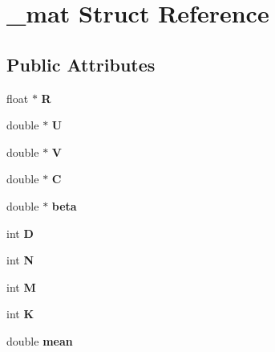 \hypertarget{struct__mat}{\section{\-\_\-mat \-Struct \-Reference}
\label{struct__mat}
}
\subsection*{\-Public \-Attributes}
\begin{DoxyCompactItemize}
\item 
\hypertarget{struct__mat_a6718a59d27cd8e2d3501e57800bf85d9}{float $\ast$ {\bfseries \-R}}\label{struct__mat_a6718a59d27cd8e2d3501e57800bf85d9}

\item 
\hypertarget{struct__mat_a0d29d0d3e2edc89c1da92ad47b2a0d91}{double $\ast$ {\bfseries \-U}}\label{struct__mat_a0d29d0d3e2edc89c1da92ad47b2a0d91}

\item 
\hypertarget{struct__mat_a83f1aa0816b8e0fc3921baaf9636857d}{double $\ast$ {\bfseries \-V}}\label{struct__mat_a83f1aa0816b8e0fc3921baaf9636857d}

\item 
\hypertarget{struct__mat_a480f63d30717e14a3342b088f9ca8836}{double $\ast$ {\bfseries \-C}}\label{struct__mat_a480f63d30717e14a3342b088f9ca8836}

\item 
\hypertarget{struct__mat_a1f4ca580f7d2834b2aa7cbceb733ad4c}{double $\ast$ {\bfseries beta}}\label{struct__mat_a1f4ca580f7d2834b2aa7cbceb733ad4c}

\item 
\hypertarget{struct__mat_aeed3177d58c430fce8550389124f8586}{int {\bfseries \-D}}\label{struct__mat_aeed3177d58c430fce8550389124f8586}

\item 
\hypertarget{struct__mat_af01a61786743a215d56537d3cead86a9}{int {\bfseries \-N}}\label{struct__mat_af01a61786743a215d56537d3cead86a9}

\item 
\hypertarget{struct__mat_abd80a8fe390ed22671e93d0b1cb15d91}{int {\bfseries \-M}}\label{struct__mat_abd80a8fe390ed22671e93d0b1cb15d91}

\item 
\hypertarget{struct__mat_ad6c51ea46d76c30cbaf20aa814708d67}{int {\bfseries \-K}}\label{struct__mat_ad6c51ea46d76c30cbaf20aa814708d67}

\item 
\hypertarget{struct__mat_a093e431ebae7a526fff81cb905226b8b}{double {\bfseries mean}}\label{struct__mat_a093e431ebae7a526fff81cb905226b8b}


\end{DoxyCompactItemize}
